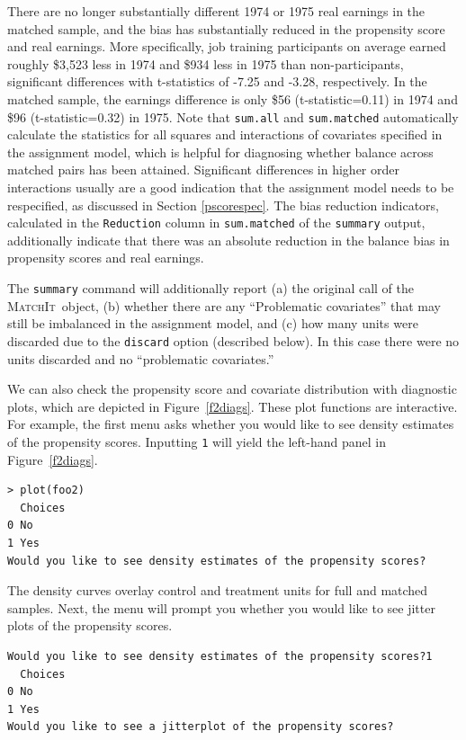 \documentclass[oneside,letterpaper,titlepage]{article}
\newcommand{\MatchIt}{\textsc{MatchIt}}
\begin{document}
There are no longer substantially different 1974 or 1975 real earnings
in the matched sample, and the bias has substantially reduced in the
propensity score and real earnings.  More specifically, job training
participants on average earned roughly \$3,523 less in 1974 and \$934
less in 1975 than non-participants, significant differences with
t-statistics of -7.25 and -3.28, respectively.  In the matched sample,
the earnings difference is only \$56 (t-statistic=0.11) in 1974 and
\$96 (t-statistic=0.32) in 1975.  Note that \texttt{sum.all} and
\texttt{sum.matched} automatically calculate the statistics for all
squares and interactions of covariates specified in the assignment
model, which is helpful for diagnosing whether balance across matched
pairs has been attained.  Significant differences in higher order
interactions usually are a good indication that the assignment model
needs to be respecified, as discussed in Section \ref{pscorespec}.
The bias reduction indicators, calculated in the \texttt{Reduction}
column in \texttt{sum.matched} of the {\tt summary} output,
additionally indicate that there was an absolute reduction in the
balance bias in propensity scores and real earnings.

The \texttt{summary} command will additionally report (a) the original
call of the \MatchIt\ object, (b) whether there are any ``Problematic
covariates'' that may still be imbalanced in the assignment model, and
(c) how many units were discarded due to the \texttt{discard} option
(described below).  In this case there were no units discarded and no
``problematic covariates.''

We can also check the propensity score and covariate distribution with
diagnostic plots, which are depicted in Figure~\ref{f2diags}.  These
plot functions are interactive.  For example, the first menu asks
whether you would like to see density estimates of the propensity
scores.  Inputting \texttt{1} will yield the left-hand panel in
Figure~\ref{f2diags}.

\begin{verbatim}
> plot(foo2)
  Choices
0 No     
1 Yes    
Would you like to see density estimates of the propensity scores?
\end{verbatim}

The density curves overlay control and treatment units for full and
matched samples.  Next, the menu will prompt you whether you would
like to see jitter plots of the propensity scores.

\begin{verbatim}
Would you like to see density estimates of the propensity scores?1
  Choices
0 No     
1 Yes    
Would you like to see a jitterplot of the propensity scores?
\end{verbatim}
\end{document}
